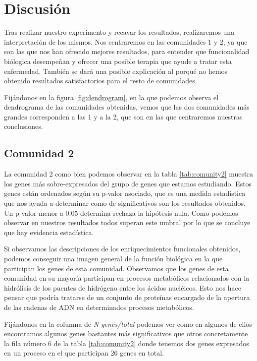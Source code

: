 \section{Discusión}

Tras realizar nuestro experimento y recavar los resultados, realizaremos una interpretación de los mismos. Nos centraremos en las comunidades 1 y 2, ya que son las que nos han ofrecido mejores resultados, para entender que funcionalidad biólogica desempeñan y ofrecer una posible terapia que ayude a tratar esta enfermedad. También se dará una posible explicación al porqué no hemos obtenido resultados satisfactorios para el resto de comunidades.

Fijándonos en la figura \ref{fig:dendrogram}, en la que podemos observa el dendrograma de las comunidades obtenidas, vemos que las dos comunidades más grandes corresponden a las 1 y a la 2, que son en las que centraremos nuestras conclusiones.

\subsection{Comunidad 2}

La comunidad 2 como bien podemos observar en la tabla \ref{tab:comunity2} muestra los genes más sobre-expresados del grupo de genes que estamos estudiando. Estos genes están ordenados según su p-valor asociado, que es una medida estadística que nos ayuda a determinar como de significativos son los resultados obtenidos. Un p-valor menor a 0.05 determina rechaza la hipótesis nula. Como podemos observar en nuestros resultados todos superan este umbral por lo que se concluye que hay evidencia estadística. 

Si observamos las descripciones de los enriquecimientos funcionales obtenidos, podemos conseguir una imagen general de la función biológica en la que participan los genes de esta comunidad. Observamos que los genes de esta comunidad en su mayoría participan en procesos metabólicos relacionados con la hidrólisis de los puentes de hidrógeno entre los ácidos nucléicos. Esto nos hace pensar que podría tratarse de un conjunto de proteínas encargado de la apertura de las cadenas de ADN en determinados procesos metabólicos.

Fijándonos en la columna de \textit{N genes/total} podemos ver como en algunos de ellos encontramos algunos genes bastantes más significativos que otros concretamente la fila número 6 de la tabla \ref{tab:comunity2} donde tenemos dos genes expresados en un proceso en el que participan 26 genes en total.

